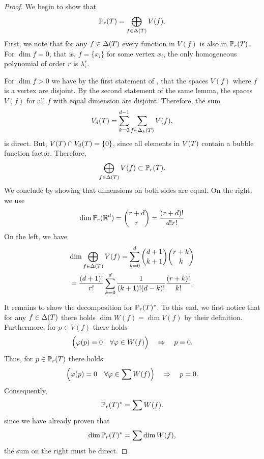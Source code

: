 \begin{proof}
  We begin to show that
  \begin{gather*}
    \P_r(\cell) = \bigoplus_{f\in\Delta(\cell)}V(f).
  \end{gather*}
  First, we note that for any $f\in\Delta(\cell)$ every function in $V(f)$
  is also in $\P_r(\cell)$.  For $\dim f=0$, that is, $f=\{x_i\}$ for some
  vertex $x_i$, the only homogeneous polynomial of order $r$ is $\lambda_i^r$.

  For $\dim f > 0$ we have by the first statement of
  , that the spaces $V(f)$
  where $f$ is a vertex are disjoint. By the second statement of the
  same lemma, the spaces $V(f)$ for all $f$ with equal dimension are
  disjoint. Therefore, the sum
  \begin{gather*}
    V_d(\cell) = \sum_{k=0}^{d-1} \sum_{f\in \Delta_k(\cell)} V(f),
  \end{gather*}
  is direct. But, $V(\cell) \cap V_d(\cell) = \{0\}$, since all elements in
  $V(\cell)$ contain a bubble function factor. Therefore,
  \begin{gather*}
    \bigoplus_{f\in\Delta(\cell)}V(f) \subset \P_r(\cell).
  \end{gather*}
  We conclude by showing that dimensions on both sides are equal.
  On the right, we use
  \begin{gather*}
    \dim \P_r(\R^d) = \binom{r+d}{r} = \frac{(r+d)!}{d!r!}
  \end{gather*}
  On the left, we have
  \begin{multline*}
    \dim \bigoplus_{f\in\Delta(\cell)}V(f) =
    \sum_{k=0}^{d} \binom{d+1}{k+1} \binom{r+k}{k}
    \\
    = \frac{(d+1)!}{r!}
    \sum_{k=0}^{d} \frac{1}{(k+1)!(d-k)!} \frac{(r+k)!}{k!}.
  \end{multline*}


  It remains to show the decomposition for $\P_r(\cell)^*$. To this
  end, we first notice that for any $f\in\Delta(\cell)$ there holds
  $\dim W(f) = \dim V(f)$ by their definition. Furthermore, for
  $p\in V(f)$ there holds
  \begin{gather*}
    \Bigl(\phi(p) = 0 \quad\forall \phi\in W(f)\Bigr)
    \quad\Rightarrow\quad
    p=0.
  \end{gather*}
  Thus, for $p\in \P_r(\cell)$ there holds
  \begin{gather*}
    \Bigl(\phi(p) = 0 \quad\forall \phi\in \sum W(f)\Bigr)
    \quad\Rightarrow\quad
    p=0.
  \end{gather*}
  Consequently,
  \begin{gather*}
    \P_r(\cell)^* = \sum W(f).
  \end{gather*}
  since we have already proven that
  \begin{gather*}
    \dim \P_r(\cell)^* = \sum \dim W(f),
  \end{gather*}
  the sum on the right must be direct.
\end{proof}

